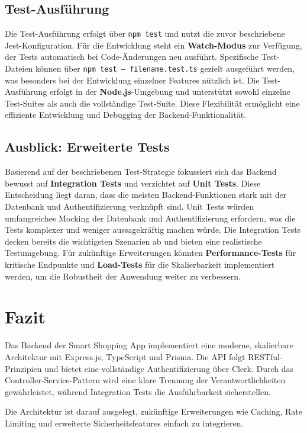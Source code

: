 \subsection{Test-Ausführung}

Die Test-Ausführung erfolgt über \texttt{npm test} und nutzt die zuvor beschriebene Jest-Konfiguration. Für die Entwicklung steht ein \textbf{Watch-Modus} zur Verfügung, der Tests automatisch bei Code-Änderungen neu ausführt. Spezifische Test-Dateien können über \texttt{npm test -- filename.test.ts} gezielt ausgeführt werden, was besonders bei der Entwicklung einzelner Features nützlich ist. Die Test-Ausführung erfolgt in der \textbf{Node.js}-Umgebung und unterstützt sowohl einzelne Test-Suites als auch die vollständige Test-Suite. Diese Flexibilität ermöglicht eine effiziente Entwicklung und Debugging der Backend-Funktionalität.

\subsection{Ausblick: Erweiterte Tests}

Basierend auf der beschriebenen Test-Strategie fokussiert sich das Backend bewusst auf \textbf{Integration Tests} und verzichtet auf \textbf{Unit Tests}. Diese Entscheidung liegt daran, dass die meisten Backend-Funktionen stark mit der Datenbank und Authentifizierung verknüpft sind. Unit Tests würden umfangreiches Mocking der Datenbank und Authentifizierung erfordern, was die Tests komplexer und weniger aussagekräftig machen würde. Die Integration Tests decken bereits die wichtigsten Szenarien ab und bieten eine realistische Testumgebung. Für zukünftige Erweiterungen könnten \textbf{Performance-Tests} für kritische Endpunkte und \textbf{Load-Tests} für die Skalierbarkeit implementiert werden, um die Robustheit der Anwendung weiter zu verbessern.

\section{Fazit}

Das Backend der Smart Shopping App implementiert eine moderne, skalierbare Architektur mit Express.js, TypeScript und Prisma. Die API folgt RESTful-Prinzipien und bietet eine vollständige Authentifizierung über Clerk. Durch das Controller-Service-Pattern wird eine klare Trennung der Verantwortlichkeiten gewährleistet, während Integration Tests die Ausführbarkeit sicherstellen.

Die Architektur ist darauf ausgelegt, zukünftige Erweiterungen wie Caching, Rate Limiting und erweiterte Sicherheitsfeatures einfach zu integrieren.

\cleardoublepage


